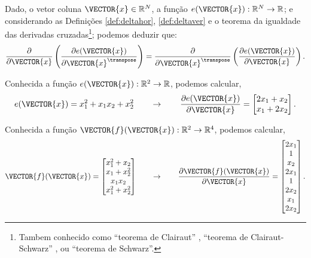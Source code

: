 \begin{corollary}\label{cor:derder}
Dado,
o vetor coluna $\VECTOR{x}\in \mathbb{R}^N$, 
a função $e(\VECTOR{x}): \mathbb{R}^N \rightarrow \mathbb{R}$; e
considerando as Definições \ref{def:deltahor}, \ref {def:deltaver} e o 
teorema da igualdade das derivadas cruzadas\footnote{Tambem conhecido como 
``teorema de Clairaut'' \cite[pp. 885]{stewart2008calculus},
 ``teorema de Clairaut-Schwarz'' \cite[pp. 311]{telles2015matematica}, ou ``teorema de Schwarz''.}; 
podemos deduzir que:
\begin{equation}
 \frac{\partial }{\partial \VECTOR{x}} \left( \frac{\partial e(\VECTOR{x} )}{\partial \VECTOR{x}^{\transpose}} \right) = 
\frac{\partial }{\partial \VECTOR{x}^{\transpose}} \left( \frac{\partial e(\VECTOR{x} )}{\partial \VECTOR{x}} \right).
\end{equation}
\end{corollary}


\begin{example}
Conhecida a função $e(\VECTOR{x}): \mathbb{R}^2 \rightarrow \mathbb{R}$, podemos calcular,
\begin{equation}
e(\VECTOR{x})=x_1^2+x_1 x_2+x_2^2
\qquad \rightarrow \qquad
\frac{\partial e(\VECTOR{x}) }{\partial \VECTOR{x}}=
\begin{bmatrix}
 2 x_1 + x_2 \\
 x_1 + 2 x_2
\end{bmatrix}.
\end{equation}
\end{example}


\begin{example}
Conhecida a função $\VECTOR{f}(\VECTOR{x}): \mathbb{R}^2 \rightarrow \mathbb{R}^4$, podemos calcular,
\begin{equation}
\VECTOR{f}(\VECTOR{x})=
\begin{bmatrix}
x_1^2+x_2\\
x_1+x_2^2\\
x_1 x_2 \\
x_1^2+x_2^2
\end{bmatrix}
\qquad \rightarrow \qquad
\frac{\partial \VECTOR{f}(\VECTOR{x}) }{\partial \VECTOR{x}}= 
\begin{bmatrix}
2 x_1 \\
1     \\
x_2   \\
2 x_1 \\
1     \\
2 x_2 \\
x_1   \\
2 x_2
\end{bmatrix}.
\end{equation}
\end{example}


